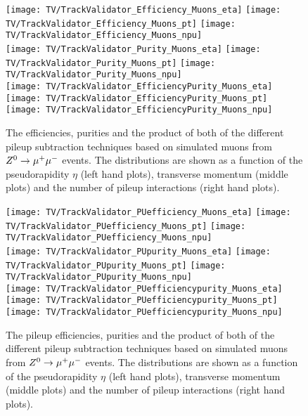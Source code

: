 \begin{figure}[Ht]
    \centering
    \texttt{[image: TV/TrackValidator\_Efficiency\_Muons\_eta]}
    \texttt{[image: TV/TrackValidator\_Efficiency\_Muons\_pt]}
    \texttt{[image: TV/TrackValidator\_Efficiency\_Muons\_npu]}
    \\
    \texttt{[image: TV/TrackValidator\_Purity\_Muons\_eta]}
    \texttt{[image: TV/TrackValidator\_Purity\_Muons\_pt]}
    \texttt{[image: TV/TrackValidator\_Purity\_Muons\_npu]}
    \\
    \texttt{[image: TV/TrackValidator\_EfficiencyPurity\_Muons\_eta]}
    \texttt{[image: TV/TrackValidator\_EfficiencyPurity\_Muons\_pt]}
    \texttt{[image: TV/TrackValidator\_EfficiencyPurity\_Muons\_npu]}
    \caption[Efficiencies, purities and their product of the different pileup subtraction techniques based on simulated muons from $\Zz\rightarrow\MM$ events]{The efficiencies, purities and the product of both of the different pileup subtraction techniques based on simulated muons from $\Zz\rightarrow\MM$ events. The distributions are shown as a function of the pseudorapidity $\eta$ (left hand plots), transverse momentum (middle plots) and the number of pileup interactions (right hand plots). \label{plot:TACOAMuSignal}}
\end{figure}

\begin{figure}[Ht]
    \centering
    \texttt{[image: TV/TrackValidator\_PUefficiency\_Muons\_eta]}
    \texttt{[image: TV/TrackValidator\_PUefficiency\_Muons\_pt]}
    \texttt{[image: TV/TrackValidator\_PUefficiency\_Muons\_npu]}
    \\
    \texttt{[image: TV/TrackValidator\_PUpurity\_Muons\_eta]}
    \texttt{[image: TV/TrackValidator\_PUpurity\_Muons\_pt]}
    \texttt{[image: TV/TrackValidator\_PUpurity\_Muons\_npu]}
    \\
    \texttt{[image: TV/TrackValidator\_PUefficiencypurity\_Muons\_eta]}
    \texttt{[image: TV/TrackValidator\_PUefficiencypurity\_Muons\_pt]}
    \texttt{[image: TV/TrackValidator\_PUefficiencypurity\_Muons\_npu]}
    \caption[Pileup efficiencies, purities and their product of the different pileup subtraction techniques based on simulated muons from $\Zz\rightarrow\MM$ events]{The pileup efficiencies, purities and the product of both of the different pileup subtraction techniques based on simulated muons from $\Zz\rightarrow\MM$ events. The distributions are shown as a function of the pseudorapidity $\eta$ (left hand plots), transverse momentum (middle plots) and the number of pileup interactions (right hand plots). \label{plot:TACOAMuPileup}}
\end{figure}

